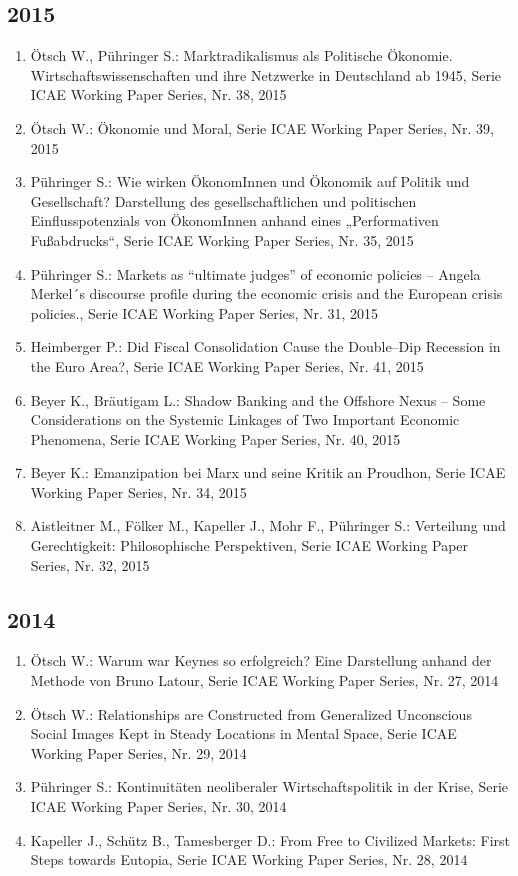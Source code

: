 \subsection*{2015}
\begin{enumerate}
    	 \item Ötsch W., Pühringer S.: Marktradikalismus als Politische Ökonomie. Wirtschaftswissenschaften und ihre Netzwerke in Deutschland ab 1945, Serie ICAE Working Paper Series, Nr. 38, 2015
	 \item Ötsch W.: Ökonomie und Moral, Serie ICAE Working Paper Series, Nr. 39, 2015
	 \item Pühringer S.: Wie wirken ÖkonomInnen und Ökonomik auf Politik und Gesellschaft? Darstellung des gesellschaftlichen und politischen Einflusspotenzials von ÖkonomInnen anhand eines „Performativen Fußabdrucks“, Serie ICAE Working Paper Series, Nr. 35, 2015
	 \item Pühringer S.: Markets as “ultimate judges” of economic policies -- Angela Merkel´s discourse profile during the economic crisis and the European crisis policies., Serie ICAE Working Paper Series, Nr. 31, 2015
	 \item Heimberger P.: Did Fiscal Consolidation Cause the Double--Dip Recession in the Euro Area?, Serie ICAE Working Paper Series, Nr. 41, 2015
	 \item Beyer K., Bräutigam L.: Shadow Banking and the Offshore Nexus -- Some Considerations on the Systemic Linkages of Two Important Economic Phenomena, Serie ICAE Working Paper Series, Nr. 40, 2015
	 \item Beyer K.: Emanzipation bei Marx und seine Kritik an Proudhon, Serie ICAE Working Paper Series, Nr. 34, 2015
	 \item Aistleitner M., Fölker M., Kapeller J., Mohr F., Pühringer S.: Verteilung und Gerechtigkeit: Philosophische Perspektiven, Serie ICAE Working Paper Series, Nr. 32, 2015
\end{enumerate}
\subsection*{2014}
\begin{enumerate}
    	 \item Ötsch W.: Warum war Keynes so erfolgreich? Eine Darstellung anhand der Methode von Bruno Latour, Serie ICAE Working Paper Series, Nr. 27, 2014
	 \item Ötsch W.: Relationships are Constructed from Generalized Unconscious Social Images Kept in Steady Locations in Mental Space, Serie ICAE Working Paper Series, Nr. 29, 2014
	 \item Pühringer S.: Kontinuitäten neoliberaler Wirtschaftspolitik in der Krise, Serie ICAE Working Paper Series, Nr. 30, 2014
	 \item Kapeller J., Schütz B., Tamesberger D.: From Free to Civilized Markets: First Steps towards Eutopia, Serie ICAE Working Paper Series, Nr. 28, 2014
\end{enumerate}
